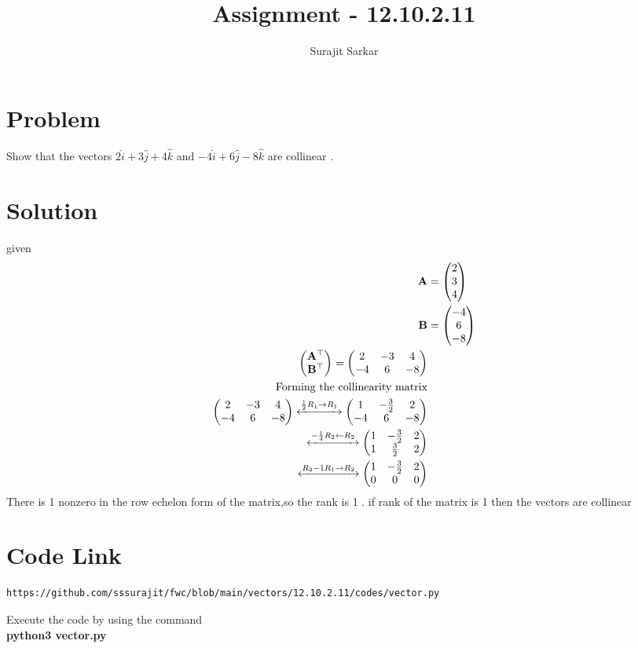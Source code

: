 \documentclass[12pt]{article}
\title{\mytitle}
\title{
Assignment - 12.10.2.11
}
\author{Surajit Sarkar}
\newcommand{\myvec}[1]{\ensuremath{\begin{pmatrix}#1\end{pmatrix}}}
\let\vec\mathbf
\begin{document}
\maketitle
\tableofcontents
\bigskip
\section{\textbf{Problem}}
Show that the vectors $2\hat{i}+3\hat{j}+4\hat{k}$ and $-4\hat{i}+6\hat{j}-8\hat{k}$ are collinear .
\section{\textbf{Solution}}
given
\begin{align}
	\vec{A}&=\myvec{2\\3\\4}\\
	\vec{B}&=\myvec{-4\\6\\-8}\\
        \myvec{\vec{A}^{\top}\\ \vec{B}^{\top}}=\myvec{2&-3&4\\-4&6&-8}\\
        \text{Forming the collinearity matrix}\\
        \myvec{2&-3&4\\-4&6&-8} \xleftrightarrow{\frac{1}{2}R_1\to R_1}\myvec{1&-\frac{3}{2}&2\\-4&6&-8}\\
        \xleftrightarrow{-\frac{1}{4}R_2\leftarrow R_2}\myvec{1&-\frac{3}{2}&2\\1&\frac{3}{2}&2}\\
        \xleftrightarrow{R_2-1R_1\to R_2}\myvec{1&-\frac{3}{2}&2\\0&0&0}
\end{align}
There is 1 nonzero in the row echelon form of the matrix,so the rank is 1 .
if rank of the matrix is 1 then the vectors are collinear
\section{\textbf{Code Link}}
\begin{lstlisting}
https://github.com/sssurajit/fwc/blob/main/vectors/12.10.2.11/codes/vector.py
\end{lstlisting}
Execute the code by using the command\\
\textbf{python3 vector.py}
\end{document}
